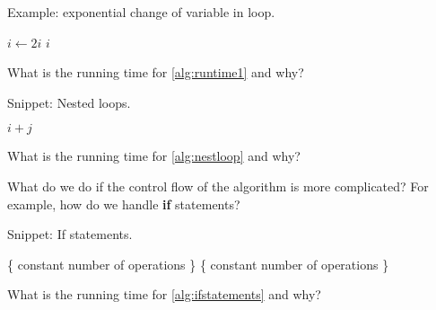 \begin{algorithm}[H]
  \caption{Example: exponential change of variable in loop.}
    \label{alg:runtime1}
\begin{algorithmic}[0]
\State {}
	\State $i \gets 2 i$
	\State {} $i$
\EndWhile
\end{algorithmic}
\end{algorithm}

\begin{Boxample}[6]
What is the running time for \cref{alg:runtime1} and why?
\end{Boxample}

\begin{algorithm}[H]
  \caption{Snippet: Nested loops.}
    \label{alg:nestloop}
\begin{algorithmic}[0]
		\State {} $i+j$
	\EndFor
\EndFor
\end{algorithmic}
\end{algorithm}

\begin{Boxample}[6]
What is the running time for \cref{alg:nestloop} and why?
\end{Boxample}

\pagebreak[4]
What do we do if the control flow of the algorithm is more complicated? 
For example, how do we handle \textbf{if} statements?

\begin{algorithm}[H]
  \caption{Snippet: If statements.}
  \label{alg:ifstatements}
\begin{algorithmic}[0]
				\State \{ constant number of operations \} 
			\EndFor
		\Else
				\State \{ constant number of operations \}
			\EndFor
		\EndIf
	\EndFor
\EndFor
\end{algorithmic}
\end{algorithm}
\begin{Boxample}[6]
What is the running time for \cref{alg:ifstatements} and why? 
\end{Boxample}


